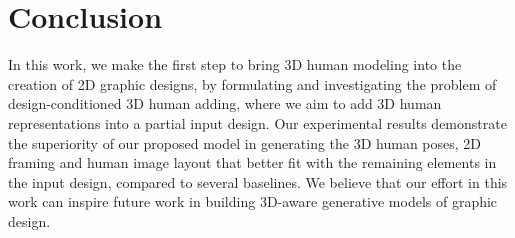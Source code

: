 \section{Conclusion}

In this work, we make the first step to bring 3D human modeling into the creation of 2D graphic designs, by formulating and investigating the problem of design-conditioned 3D human adding, where we aim to add 3D human representations into a partial input design. Our experimental results demonstrate the superiority of our proposed model in generating the 3D human poses, 2D framing and human image layout that better fit with the remaining elements in the input design, compared to several baselines. We believe that our effort in this work can inspire future work in building 3D-aware generative models of graphic design. 

\newpage
